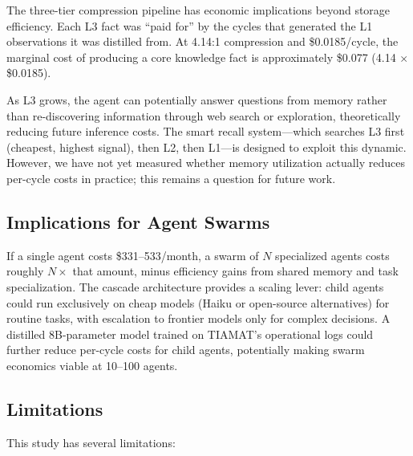\documentclass[11pt,a4paper]{article}
\begin{document}
The three-tier compression pipeline has economic implications beyond storage efficiency. Each L3 fact was ``paid for'' by the cycles that generated the L1 observations it was distilled from. At 4.14:1 compression and \$0.0185/cycle, the marginal cost of producing a core knowledge fact is approximately \$0.077 (4.14 $\times$ \$0.0185).

As L3 grows, the agent can potentially answer questions from memory rather than re-discovering information through web search or exploration, theoretically reducing future inference costs. The smart recall system---which searches L3 first (cheapest, highest signal), then L2, then L1---is designed to exploit this dynamic. However, we have not yet measured whether memory utilization actually reduces per-cycle costs in practice; this remains a question for future work.

\subsection{Implications for Agent Swarms}

If a single agent costs \$331--533/month, a swarm of $N$ specialized agents costs roughly $N \times$ that amount, minus efficiency gains from shared memory and task specialization. The cascade architecture provides a scaling lever: child agents could run exclusively on cheap models (Haiku or open-source alternatives) for routine tasks, with escalation to frontier models only for complex decisions. A distilled 8B-parameter model trained on TIAMAT's operational logs could further reduce per-cycle costs for child agents, potentially making swarm economics viable at 10--100 agents.

\subsection{Limitations}

This study has several limitations:
\end{document}
